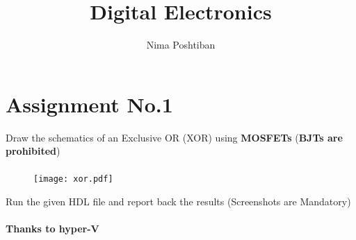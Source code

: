 \documentclass{exam}
\author{Nima Poshtiban}
\title{Digital Electronics}
\date{\displaydate{date}}
\begin{document}
\maketitle
\tableofcontents 
\pagebreak

\section{Assignment No.1}
\begin{center}
\end{center}


\begin{questions}
\question Draw the schematics of an Exclusive OR (XOR) using \textbf{MOSFETs} (\textbf{BJTs are prohibited})

\paragraph{}
\begin{figure}[httb]
 	\centering
\texttt{[image: xor.pdf]}

\end{figure}

\question Run the given HDL file and report back the results (Screenshots are Mandatory)
\paragraph{}
\textbf{Thanks to hyper-V }
\begin{figure}[h]


\end{figure}
\end{questions}
\end{document}
